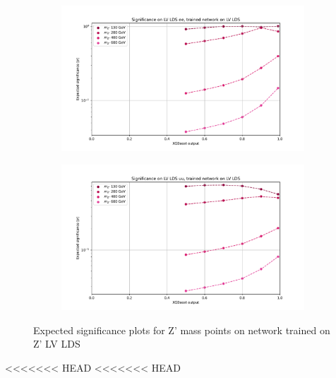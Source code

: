 \documentclass[12pt, a4paper]{book}
\begin{document}
\begin{figure}[!ht]
	\centering
	\begin{subfigure}[b]{0.49\textwidth}
      \centering
      \includegraphics[width=1\textwidth]{XGBoost/LV_LDS/EXP_SIG_ee.pdf}
      \end{subfigure}
   \hfill
   \begin{subfigure}[b]{0.49\textwidth}
      \centering
      \includegraphics[width=1\textwidth]{XGBoost/LV_LDS/EXP_SIG_uu.pdf}
      \end{subfigure}
   \caption{Expected significance plots for Z' mass points on network trained on Z' LV LDS}\label{fig:LV_LDS_exp_sig}
\end{figure}
<<<<<<< HEAD
<<<<<<< HEAD
\end{document}
